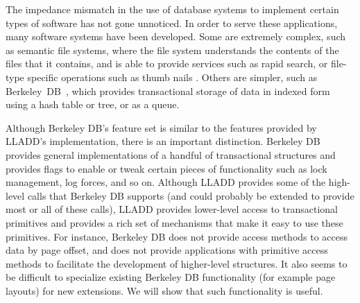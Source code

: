 \documentclass[10pt,letterpaper,twocolumn,english]{article}
\newcommand{\yad}{LLADD\xspace}
\begin{document}
The impedance mismatch in the use of database systems to implement
certain types of software has not gone unnoticed.
%
%
%
In
order to serve these applications, many software systems have been 
developed.  Some are extremely complex, such as semantic file
systems, where the file system understands the contents of the files
that it contains, and is able to provide services such as rapid
search, or file-type specific operations such as thumb nails \cite{reiser4,semantic}.  Others are simpler, such as
Berkeley~DB~\cite{berkeleyDB}, which provides transactional
storage of data in indexed form using a hash table or tree, or as a queue.  

Although Berkeley DB's feature set is similar to the features provided by
\yad's implementation, there is an important distinction.  Berkeley DB
provides general implementations of a handful of transactional
structures and provides flags to enable or tweak certain pieces of
functionality such as lock management, log forces, and so on. Although
\yad provides some of the high-level calls that Berkeley DB supports
(and could probably be extended to provide most or all of these calls), \yad
provides lower-level access to transactional primitives and provides a rich 
set of mechanisms that make it easy to use these primitives.  For
instance, Berkeley DB does not provide access methods to access data by 
page offset, and does not provide applications with primitive 
access methods to facilitate the development of higher-level structures.
It also seems to be difficult to specialize existing Berkeley DB functionality 
(for example page layouts) for new extensions.  We will show that such functionality is useful.
\end{document}
